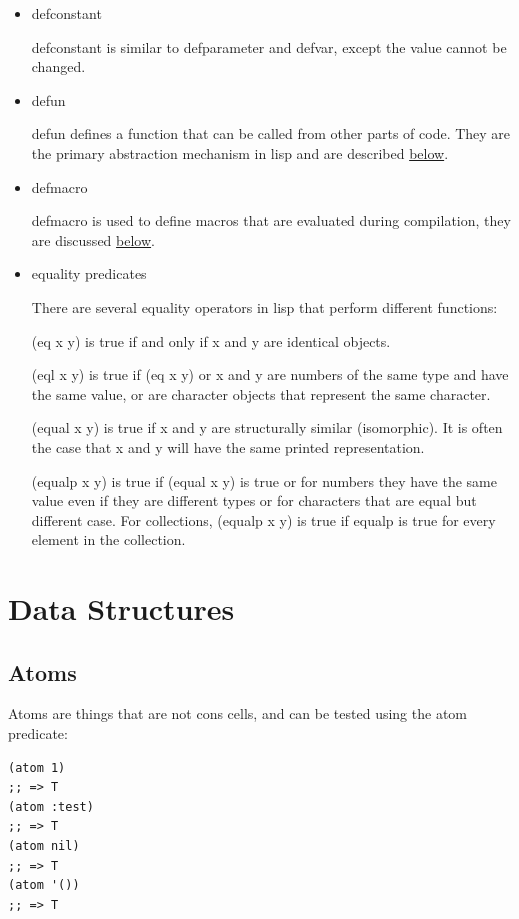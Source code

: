 \documentclass[11pt]{article}
\begin{document}
\begin{itemize}
\item defconstant

defconstant is similar to defparameter and defvar, except the
value cannot be changed.

\item defun

defun defines a function that can be called from other parts of
code. They are the primary abstraction mechanism in lisp and are
described \hyperref[sec-7]{below}.

\item defmacro

defmacro is used to define macros that are evaluated during
compilation, they are discussed \hyperref[sec-15]{below}.

\item equality predicates

There are several equality operators in lisp that perform
different functions:

(eq x y) is true if and only if x and y are identical objects.

(eql x y) is true if (eq x y) or x and y are numbers of the same
type and have the same value, or are character objects that
represent the same character.

(equal x y) is true if x and y are structurally similar
(isomorphic). It is often the case that x and y will have the same
printed representation.

(equalp x y) is true if (equal x y) is true or for numbers they
have the same value even if they are different types or for
characters that are equal but different case. For collections,
(equalp x y) is true if equalp is true for every element in the
collection.
\end{itemize}

\section{Data Structures}
\label{sec-5}
\subsection{Atoms}
\label{sec-5-1}
Atoms are things that are not cons cells, and can be tested using
the atom predicate:

\begin{verbatim}
(atom 1)
;; => T
(atom :test)
;; => T
(atom nil)
;; => T
(atom '())
;; => T
\end{verbatim}
\end{document}
